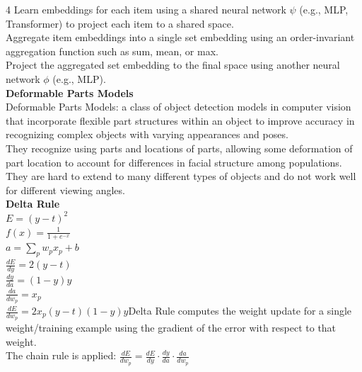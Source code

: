 \documentclass[8pt]{extarticle}
\begin{document}
\begin{multicols}{4}
Learn embeddings for each item using a shared neural network $\psi$ (e.g., MLP, Transformer) to project each item to a shared space.\\
Aggregate item embeddings into a single set embedding using an order-invariant aggregation function such as sum, mean, or max.\\
Project the aggregated set embedding to the final space using another neural network $ϕ$ (e.g., MLP).\\
\vspace{2pt}\textbf{Deformable Parts Models}\\
Deformable Parts Models: a class of object detection models in computer vision that incorporate flexible part structures within an object to improve accuracy in recognizing complex objects with varying appearances and poses.\\
They recognize using parts and locations of parts, allowing some deformation of part location to account for differences in facial structure among populations.\\
They are hard to extend to many different types of objects and do not work well for different viewing angles.\\
\vspace{2pt}\textbf{Delta Rule}\\
$E = (y - t)^2$\\
$f(x) = \frac{1}{1 + e^{-x}}$\\
$a = \sum_{p} w_{p} x_{p} + b$\\
$\frac{dE}{dy} = 2 (y - t)$\\
$\frac{dy}{da} = (1 - y) y$\\
$\frac{da}{dw_{p}} = x_{p}$\\
$\frac{dE}{dw_{p}} = 2 x_{p} (y - t) (1 - y) y$\The Delta Rule computes the weight update for a single weight/training example using the gradient of the error with respect to that weight.\\
The chain rule is applied: $\frac{dE}{dw_{p}} = \frac{dE}{dy}\cdot\frac{dy}{da}\cdot\frac{da}{dw_{p}}$\\


\end{multicols}
\end{document}
